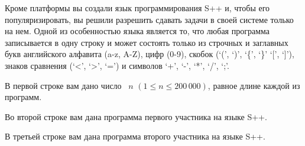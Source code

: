 Кроме платформы вы создали язык программирования S++ и, чтобы его популяризировать, вы решили разрешить сдавать задачи в своей системе только на нем. Одной из особенностью языка является то, что любая программа записывается в одну строку и может состоять только из строчных и заглавных букв английского алфавита (a-z, A-Z), цифр (0-9), скобок (`(', `)', `\{', `\}' `[', `]'), знаков сравнения (`<', `>', `=') и символов `+', `-', `*', `/', `;'. 

В первой строке вам дано число  $n$ $(1 \leqslant  n \leqslant 200\,000)$, равное длине каждой из программ.

Во второй строке вам дана программа первого участника на языке S++.

В третьей строке вам дана программа второго участника на языке S++.
